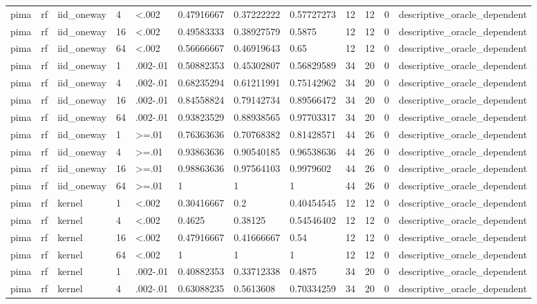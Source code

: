 \begin{tabular}{llllllllllll}
pima & rf & iid\_oneway & 4 & <.002 & 0.47916667 & 0.37222222 & 0.57727273 & 12 & 12 & 0 & descriptive\_oracle\_dependent \\
pima & rf & iid\_oneway & 16 & <.002 & 0.49583333 & 0.38927579 & 0.5875 & 12 & 12 & 0 & descriptive\_oracle\_dependent \\
pima & rf & iid\_oneway & 64 & <.002 & 0.56666667 & 0.46919643 & 0.65 & 12 & 12 & 0 & descriptive\_oracle\_dependent \\
pima & rf & iid\_oneway & 1 & .002-.01 & 0.50882353 & 0.45302807 & 0.56829589 & 34 & 20 & 0 & descriptive\_oracle\_dependent \\
pima & rf & iid\_oneway & 4 & .002-.01 & 0.68235294 & 0.61211991 & 0.75142962 & 34 & 20 & 0 & descriptive\_oracle\_dependent \\
pima & rf & iid\_oneway & 16 & .002-.01 & 0.84558824 & 0.79142734 & 0.89566472 & 34 & 20 & 0 & descriptive\_oracle\_dependent \\
pima & rf & iid\_oneway & 64 & .002-.01 & 0.93823529 & 0.88938565 & 0.97703317 & 34 & 20 & 0 & descriptive\_oracle\_dependent \\
pima & rf & iid\_oneway & 1 & >=.01 & 0.76363636 & 0.70768382 & 0.81428571 & 44 & 26 & 0 & descriptive\_oracle\_dependent \\
pima & rf & iid\_oneway & 4 & >=.01 & 0.93863636 & 0.90540185 & 0.96538636 & 44 & 26 & 0 & descriptive\_oracle\_dependent \\
pima & rf & iid\_oneway & 16 & >=.01 & 0.98863636 & 0.97564103 & 0.9979602 & 44 & 26 & 0 & descriptive\_oracle\_dependent \\
pima & rf & iid\_oneway & 64 & >=.01 & 1 & 1 & 1 & 44 & 26 & 0 & descriptive\_oracle\_dependent \\
pima & rf & kernel & 1 & <.002 & 0.30416667 & 0.2 & 0.40454545 & 12 & 12 & 0 & descriptive\_oracle\_dependent \\
pima & rf & kernel & 4 & <.002 & 0.4625 & 0.38125 & 0.54546402 & 12 & 12 & 0 & descriptive\_oracle\_dependent \\
pima & rf & kernel & 16 & <.002 & 0.47916667 & 0.41666667 & 0.54 & 12 & 12 & 0 & descriptive\_oracle\_dependent \\
pima & rf & kernel & 64 & <.002 & 1 & 1 & 1 & 12 & 12 & 0 & descriptive\_oracle\_dependent \\
pima & rf & kernel & 1 & .002-.01 & 0.40882353 & 0.33712338 & 0.4875 & 34 & 20 & 0 & descriptive\_oracle\_dependent \\
pima & rf & kernel & 4 & .002-.01 & 0.63088235 & 0.5613608 & 0.70334259 & 34 & 20 & 0 & descriptive\_oracle\_dependent \\

\end{tabular}
